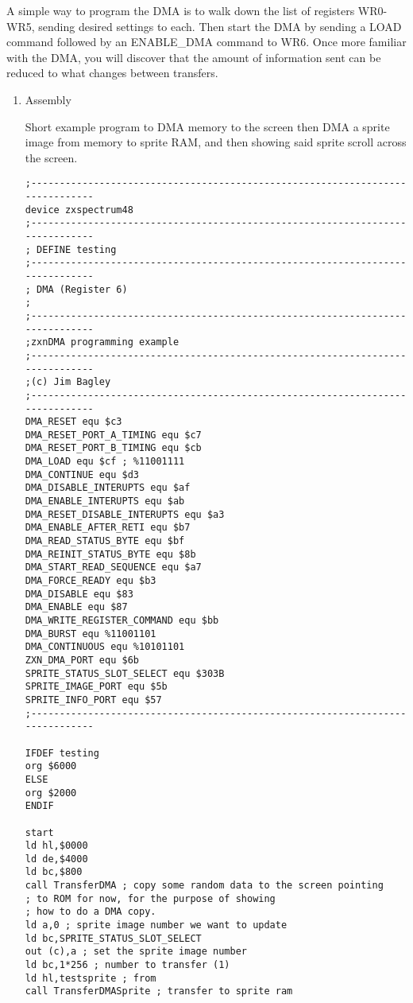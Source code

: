 \begin{multicols}{2}
A simple way to program the DMA is to walk down the list of registers
WR0-WR5, sending desired settings to each. Then start the DMA by
sending a LOAD command followed by an ENABLE\_DMA command to WR6. Once
more familiar with the DMA, you will discover that the amount of
information sent can be reduced to what changes between transfers.

\sinset
\begin{enumerate}
\item Assembly

  Short example program to DMA memory to the screen then DMA a sprite
  image from memory to sprite RAM, and then showing said sprite scroll
  across the screen.

\begin{verbatim}
;------------------------------------------------------------------------------
device zxspectrum48
;------------------------------------------------------------------------------
; DEFINE testing
;------------------------------------------------------------------------------
; DMA (Register 6)
;
;------------------------------------------------------------------------------
;zxnDMA programming example
;------------------------------------------------------------------------------
;(c) Jim Bagley
;------------------------------------------------------------------------------
DMA_RESET equ $c3
DMA_RESET_PORT_A_TIMING equ $c7
DMA_RESET_PORT_B_TIMING equ $cb
DMA_LOAD equ $cf ; %11001111
DMA_CONTINUE equ $d3
DMA_DISABLE_INTERUPTS equ $af
DMA_ENABLE_INTERUPTS equ $ab
DMA_RESET_DISABLE_INTERUPTS equ $a3
DMA_ENABLE_AFTER_RETI equ $b7
DMA_READ_STATUS_BYTE equ $bf
DMA_REINIT_STATUS_BYTE equ $8b
DMA_START_READ_SEQUENCE equ $a7
DMA_FORCE_READY equ $b3
DMA_DISABLE equ $83
DMA_ENABLE equ $87
DMA_WRITE_REGISTER_COMMAND equ $bb
DMA_BURST equ %11001101
DMA_CONTINUOUS equ %10101101
ZXN_DMA_PORT equ $6b
SPRITE_STATUS_SLOT_SELECT equ $303B
SPRITE_IMAGE_PORT equ $5b
SPRITE_INFO_PORT equ $57
;------------------------------------------------------------------------------

IFDEF testing
org $6000
ELSE
org $2000
ENDIF

start
ld hl,$0000
ld de,$4000
ld bc,$800
call TransferDMA ; copy some random data to the screen pointing
; to ROM for now, for the purpose of showing
; how to do a DMA copy.
ld a,0 ; sprite image number we want to update
ld bc,SPRITE_STATUS_SLOT_SELECT
out (c),a ; set the sprite image number
ld bc,1*256 ; number to transfer (1)
ld hl,testsprite ; from
call TransferDMASprite ; transfer to sprite ram


\end{verbatim}
\end{enumerate}
\end{multicols}
